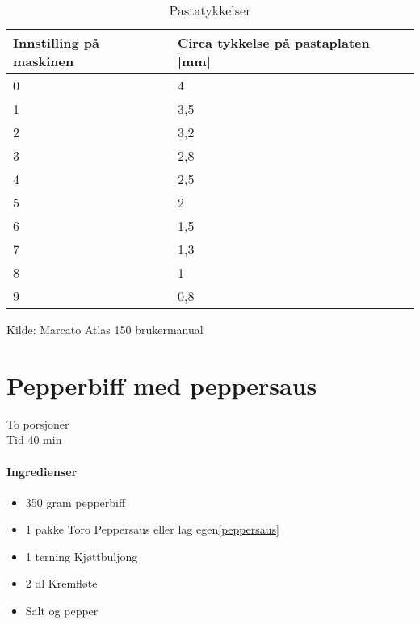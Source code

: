 \documentclass[12pt,a4paper]{book}
\begin{document}
\begin{table}[]
\centering
\begin{tabular}{ll}
\hline
Innstilling på maskinen & Circa tykkelse på pastaplaten [mm] \\ \hline
0                       & 4                                              \\
1                       & 3,5                                            \\
2                       & 3,2                                            \\
3                       & 2,8                                            \\
4                       & 2,5                                            \\
5                       & 2                                              \\
6                       & 1,5                                            \\
7                       & 1,3                                            \\
8                       & 1                                              \\
9                       & 0,8                                            \\ \hline
\end{tabular}
\caption{Pastatykkelser}
\label{pastatykkelser}
\end{table}

Kilde: Marcato Atlas 150 brukermanual
\clearpage{}
\clearpage{}\section{﻿Pepperbiff med peppersaus}
To porsjoner\\
Tid 40 min

\paragraph{Ingredienser}
\begin{itemize}[noitemsep]
	\item 350 gram  pepperbiff
	\item 1 pakke Toro Peppersaus eller lag egen\ref{peppersaus}
	\item 1 terning Kjøttbuljong
	\item 2 dl Kremfløte
	\item Salt og pepper
\end{itemize}
\end{document}
